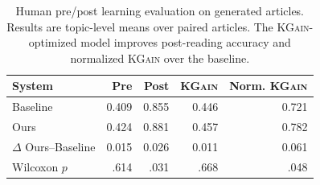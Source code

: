 \begin{table}[t]
\centering
\small
\setlength{\tabcolsep}{4pt}
\begin{tabular}{lrrrr}
\toprule
System & Pre & Post & \textsc{KGain} & Norm. \textsc{KGain} \\
\midrule
Baseline & 0.409 & 0.855 & 0.446 & 0.721 \\
Ours & 0.424 & 0.881 & 0.457 & 0.782 \\
\midrule
$\Delta$ Ours--Baseline & 0.015 & 0.026 & 0.011 & 0.061 \\
Wilcoxon $p$ & .614 & .031 & .668 & .048 \\
\bottomrule
\end{tabular}
\caption{Human pre/post learning evaluation on generated articles. Results are topic-level means over paired articles. The \textsc{KGain}-optimized model improves post-reading accuracy and normalized \textsc{KGain} over the baseline.}
\label{tab:human_kgain_generated}
\end{table}
